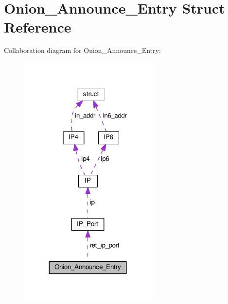 \hypertarget{struct_onion___announce___entry}{\section{Onion\+\_\+\+Announce\+\_\+\+Entry Struct Reference}
\label{struct_onion___announce___entry}
}


Collaboration diagram for Onion\+\_\+\+Announce\+\_\+\+Entry\+:
\nopagebreak
\begin{figure}[H]
\begin{center}
\leavevmode
\includegraphics[width=200pt]{struct_onion___announce___entry__coll__graph}
\end{center}
\end{figure}
